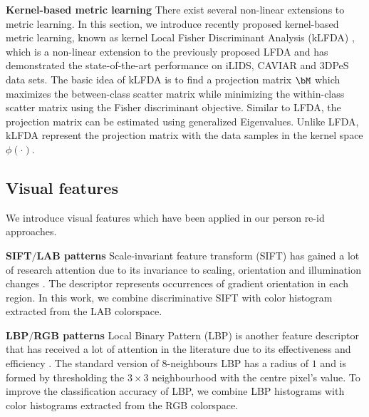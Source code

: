 \documentclass[10pt,twocolumn,letterpaper]{article}
\renewcommand{\paragraph}{\textbf}
\begin{document}
\paragraph{Kernel-based metric learning}
There exist several non-linear extensions to metric learning.
In this section, we introduce recently proposed kernel-based
metric learning, known as kernel Local Fisher Discriminant
Analysis (kLFDA) \cite{Xiong2014Person},
which is a non-linear extension to the previously
proposed LFDA \cite{Pedagadi2013Local} and
has demonstrated the state-of-the-art
performance on iLIDS, CAVIAR and 3DPeS data sets.
The basic idea of kLFDA is to find a projection matrix $\bM$
which maximizes the between-class scatter matrix while minimizing
the within-class scatter matrix using the Fisher discriminant
objective.
Similar to LFDA, the projection matrix can be estimated using
generalized Eigenvalues.
Unlike LFDA, kLFDA represent the projection matrix with the
data samples in the kernel space $\phi(\cdot)$.

\subsection{Visual features}
\label{subsec:feat}
We introduce visual features which have been applied in
our person re-id approaches.

\paragraph{SIFT$/$LAB patterns}
Scale-invariant feature transform (SIFT) has
gained a lot of research attention
due to its invariance to scaling, orientation and illumination
changes \cite{Lowe2004Distinctive}.
The descriptor represents occurrences of gradient orientation
in each region.
In this work, we combine discriminative SIFT with color histogram
extracted from the LAB colorspace.





\paragraph{LBP$/$RGB patterns}
Local Binary Pattern (LBP) is another feature descriptor
that has received a lot of attention in the literature
due to its effectiveness and efficiency \cite{Ojala2002Multiresolution}.
The standard version of $8$-neighbours LBP has a radius of $1$
and is formed by thresholding the $3 \times 3$
neighbourhood with the centre pixel's value.
To improve the classification accuracy of LBP,
we combine LBP histograms with color histograms extracted
from the RGB colorspace.
\end{document}

